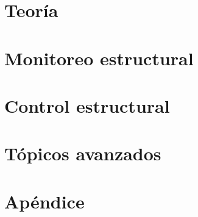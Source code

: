 \documentclass[10pt]{report}
\begin{document}







\tableofcontents

\newpage


\pagestyle{fancy}

\part{Teoría}











\part{Monitoreo estructural}







\part{Control estructural}







\part{Tópicos avanzados}









\appendix

\part*{Apéndice}







\newpage

\printbibliography[heading=bibintoc]
\end{document}
